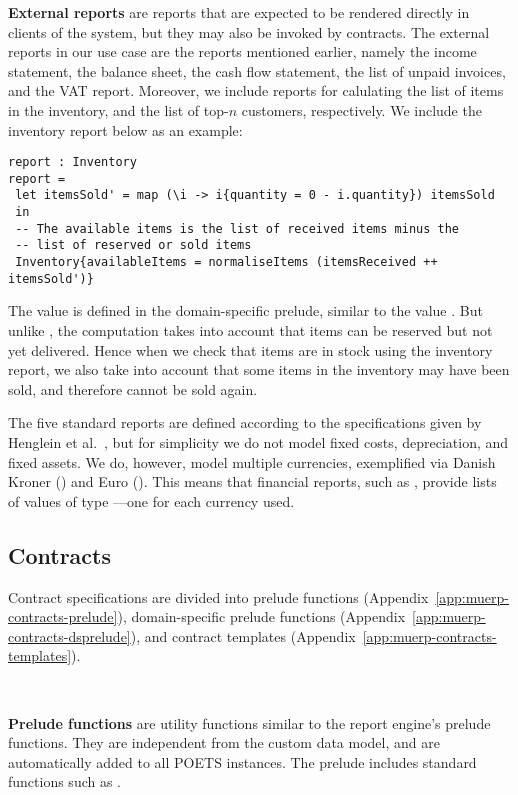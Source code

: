 \noindent\textbf{External reports} are reports that are expected to be
rendered directly in clients of the system, but they may also be
invoked by contracts. The external reports in our use case are the
reports mentioned earlier, namely the income statement, the balance
sheet, the cash flow statement, the list of unpaid invoices, and the
VAT report. Moreover, we include reports for calulating the list of
items in the inventory, and the list of top-$n$ customers,
respectively. We include the inventory report below as an example:
\begin{lstlisting}[language=parrot,basicstyle=\small]
report : Inventory
report =
 let itemsSold' = map (\i -> i{quantity = 0 - i.quantity}) itemsSold
 in
 -- The available items is the list of received items minus the
 -- list of reserved or sold items
 Inventory{availableItems = normaliseItems (itemsReceived ++ itemsSold')}
\end{lstlisting}
The value  is defined in the domain-specific
prelude, similar to the value . But unlike
, the computation takes into account that items can be
reserved but not yet delivered. Hence when we check that items
are in stock using the inventory report, we also take into account
that some items in the inventory may have been sold, and therefore cannot
be sold again.

The five standard reports are defined according to the specifications
given by Henglein et al.~\cite[Section~2.1]{henglein09jlap}, but for
simplicity we do not model fixed costs, depreciation, and fixed
assets. We do, however, model multiple currencies, exemplified via
Danish Kroner () and Euro (). This
means that financial reports, such as , provide
lists of values of type ---one for each currency
used.


\subsection{Contracts}
\label{sec:use-case-contracts}
Contract specifications are divided into prelude functions
(Appendix~\ref{app:muerp-contracts-prelude}), domain-specific prelude
functions (Appendix~\ref{app:muerp-contracts-dsprelude}), and contract
templates (Appendix~\ref{app:muerp-contracts-templates}).

~

\noindent\textbf{Prelude functions} are utility functions similar to
the report engine's prelude functions. They are independent from the
custom data model, and are automatically added to all POETS
instances. The prelude includes standard functions such as
.

